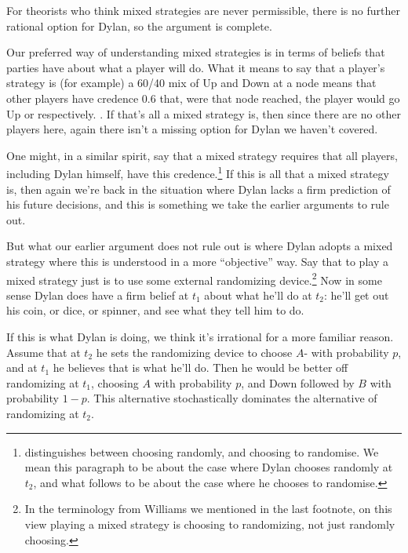 \documentclass[
  11pt,
  letterpaper]{article}
\begin{document}
For theorists who think mixed strategies are never permissible, there is no further rational option for Dylan, so the argument is complete.

Our preferred way of understanding mixed strategies is in terms of beliefs that parties have about what a player will do. What it means to say that a player's strategy is (for example) a 60/40 mix of Up and Down at a node means that other players have credence 0.6 that, were that node reached, the player would go Up or respectively. \citep{Aumann1987}. If that's all a mixed strategy is, then since there are no other players here, again there isn't a missing option for Dylan we haven't covered.

One might, in a similar spirit, say that a mixed strategy requires that all players, including Dylan himself, have this credence.\footnote{\citet{Williams2014} distinguishes between choosing randomly, and choosing to randomise. We mean this paragraph to be about the case where Dylan chooses randomly at $t_2$, and what follows to be about the case where he chooses to randomise.} If this is all that a mixed strategy is, then again we're back in the situation where Dylan lacks a firm prediction of his future decisions, and this is something we take the earlier arguments to rule out.

But what our earlier argument does not rule out is where Dylan adopts a mixed strategy where this is understood in a more ``objective'' way. Say that to play a mixed strategy just is to use some external randomizing device.\footnote{In the terminology from Williams we mentioned in the last footnote, on this view playing a mixed strategy is choosing to randomizing, not just randomly choosing.} Now in some sense Dylan does have a firm belief at $t_1$ about what he'll do at $t_2$: he'll get out his coin, or dice, or spinner, and see what they tell him to do.

If this is what Dylan is doing, we think it's irrational for a more familiar reason. Assume that at $t_2$ he sets the randomizing device to choose $A$- with probability $p$, and at $t_1$ he believes that is what he'll do. Then he would be better off randomizing at $t_1$, choosing $A$ with probability $p$, and Down followed by $B$ with probability $1-p$. This alternative stochastically dominates the alternative of randomizing at $t_2$.
\end{document}
